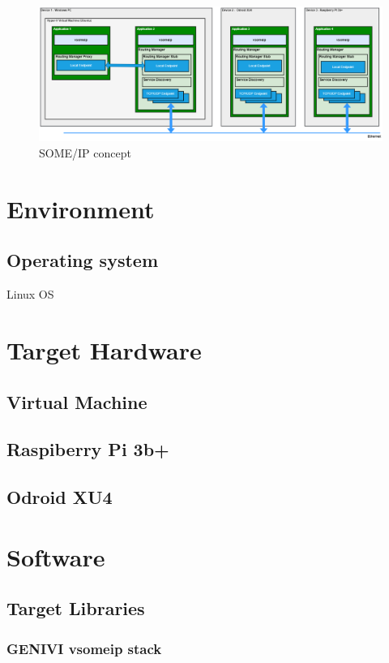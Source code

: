 \begin{figure}[!htb]
	\centering
		\includegraphics[width=1\textwidth]{images/SOMEIP_concept.png}
	\caption{SOME/IP concept}
	\label{fig:SOMEIP_concept}
\end{figure}




\section{Environment}
\subsection{Operating system}
Linux OS

\section{Target Hardware}
\subsection{Virtual Machine}
\subsection{Raspiberry Pi 3b+}
\subsection{Odroid XU4}

\section{Software}
\subsection{Target Libraries}
\subsubsection{GENIVI vsomeip stack}

